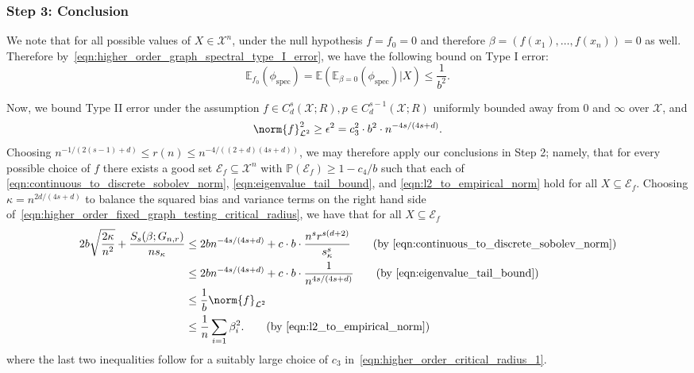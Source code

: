 \documentclass{article}
\newcommand{\1}{\mathbf{1}}
\newcommand{\Xset}{\mathcal{X}}
\newcommand{\Leb}{\mathcal{L}}
\newcommand{\Pbb}{\mathbb{P}}
\newcommand{\Ebb}{\mathbb{E}}
\newcommand{\spec}{\mathrm{spec}}
\theoremstyle{alden}
\theoremstyle{aldenthm}
\theoremstyle{definition}
\theoremstyle{remark}
\begin{document}
\subsubsection{Step 3: Conclusion}

We note that for all possible values of $X \in \Xset^n$, under the null hypothesis $f = f_0 = 0$ and therefore $\beta = (f(x_1),\ldots,f(x_n)) = 0$ as well. Therefore by~\eqref{eqn:higher_order_graph_spectral_type_I_error}, we have the following bound on Type I error:
\begin{equation}
\Ebb_{f_0}(\phi_{\mathrm{spec}}) = \mathbb{E}(\mathbb{E}_{\beta = 0}(\phi_{\spec}) | X) \leq \frac{1}{b^2}.
\end{equation}

Now, we bound Type II error under the assumption $f \in C_d^s(\mathcal{X};R), p \in C_d^{s - 1}(\Xset;R)$ uniformly bounded away from $0$ and $\infty$ over $\Xset$, and 
\begin{equation}
\label{eqn:higher_order_critical_radius_1}
\norm{f}_{\Leb^2}^2 \geq \epsilon^2 = c_3^2 \cdot b^2 \cdot n^{-4s/(4s + d)}.
\end{equation}
Choosing $n^{-1/(2(s - 1) + d)}\leq r(n) \leq n^{-4/((2+d)(4s + d))}$, we may therefore apply our conclusions in Step 2; namely, that for every possible choice of $f$ there exists a good set $\mathcal{E}_f \subseteq \Xset^n$ with $\Pbb(\mathcal{E}_f) \geq 1 - c_4/b$ such that each of \eqref{eqn:continuous_to_discrete_sobolev_norm}, \eqref{eqn:eigenvalue_tail_bound}, and \eqref{eqn:l2_to_empirical_norm} hold for all $X \subseteq \mathcal{E}_f$. Choosing $\kappa = n^{2d/(4s + d)}$ to balance the squared bias and variance terms on the right hand side of~\eqref{eqn:higher_order_fixed_graph_testing_critical_radius}, we have that for all $X \subseteq \mathcal{E}_f$
\begin{align*}
2b\sqrt{\frac{2\kappa}{n^2}} + \frac{S_s(\beta;G_{n,r})}{ns_{\kappa}} & \leq 2bn^{-4s/(4s+d)} + c\cdot b \cdot \frac{n^{s} r^{s(d + 2)}}{s_{\kappa}^s} \tag{by \eqref{eqn:continuous_to_discrete_sobolev_norm}} \\
& \leq 2bn^{-4s/(4s+d)} + c\cdot b \cdot\frac{1}{n^{4s/(4s+d)}} \tag{by \eqref{eqn:eigenvalue_tail_bound}} \\
& \leq \frac{1}{b}\norm{f}_{\Leb^2} \\
& \leq \frac{1}{n}\sum_{i = 1} \beta_i^2. \tag{by \eqref{eqn:l2_to_empirical_norm}}
\end{align*}
where the last two inequalities follow for a suitably large choice of $c_3$ in~\eqref{eqn:higher_order_critical_radius_1}.
\end{document}
